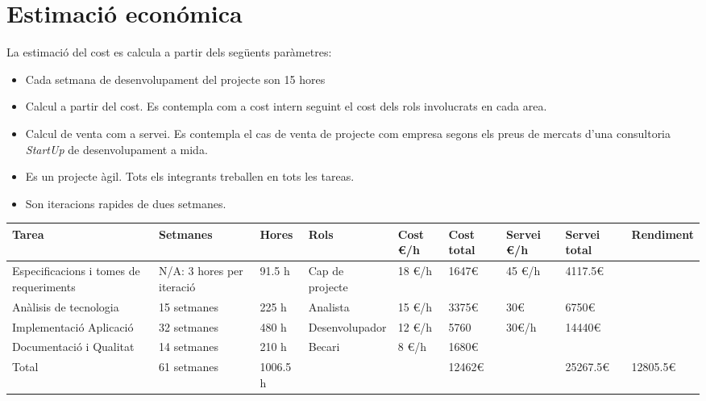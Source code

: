 \section{Estimaci\'{o} econ\'{o}mica}
La estimació del cost es calcula a partir dels següents paràmetres:
\begin{itemize}
\item Cada setmana de desenvolupament del projecte son 15 hores
\item Calcul a partir del cost. Es contempla com a cost intern seguint el cost dels rols involucrats en cada area.
\item Calcul de venta com a servei. Es contempla el cas de venta de projecte com empresa segons els preus de mercats d'una consultoria \textit{StartUp} de desenvolupament a mida.
\item Es un projecte àgil. Tots els integrants treballen en tots les tareas.
\item Son iteracions rapides de dues setmanes.
\end{itemize}

\begin{table}
\begin{tabular}{|p{3cm}|p{2cm}|p{1cm}|p{3cm}|p{1cm}|p{2cm}|p{2cm}|p{2cm}|p{2cm}|}
\hline
Tarea & Setmanes & Hores & Rols & Cost \euro/h & Cost total & Servei \euro/h & Servei total & Rendiment \\ \hline
Especificacions i tomes de requeriments & N/A: 3 hores per iteració & 91.5 h & Cap de projecte & 18 \euro/h & 1647\euro & 45 \euro/h & 4117.5\euro & \\ \hline
Anàlisis de tecnologia & 15 setmanes & 225 h & Analista & 15 \euro/h & 3375\euro & 30\euro & 6750\euro & \\ \hline
Implementació Aplicació & 32 setmanes & 480 h & Desenvolupador & 12 \euro/h & 5760 & 30\euro/h & 14440\euro & \\ \hline
Documentació i Qualitat & 14 setmanes & 210 h & Becari & 8 \euro/h & 1680\euro & & & \\ \hline 
\hline
Total & 61 setmanes & 1006.5 h & & & 12462\euro & & 25267.5\euro & 12805.5\euro \\ \hline
\end{tabular}
\end{table}

